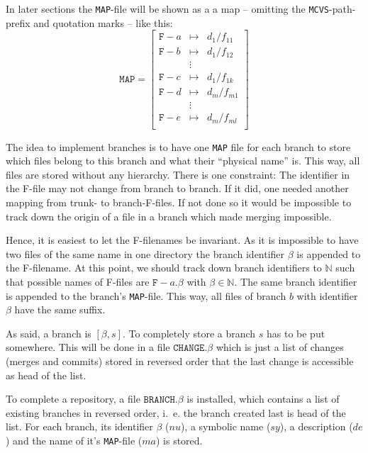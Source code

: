 \documentclass[fleqn, 10pt, a4paper]{report}
\begin{document}
In later sections the \texttt{MAP}-file will be shown as a
a map -- omitting the \texttt{MCVS}-path-prefix and quotation
marks -- like this:
\begin{displaymath}
\mathtt{MAP} =\left[
\begin{array}{lcl}
\mathtt{F-}a &\mapsto& d_1/f_{11} \\
\mathtt{F-}b &\mapsto& d_1/f_{12} \\
             &\vdots & \\
\mathtt{F-}c &\mapsto& d_1/f_{1k} \\
\mathtt{F-}d &\mapsto& d_m/f_{m1} \\
             &\vdots & \\
\mathtt{F-}e &\mapsto& d_m/f_{ml} \\
\end{array}\right]
\end{displaymath}

The idea to implement branches is to have one \texttt{MAP} file
for each branch to store which files belong to this branch and what
their ``physical name'' is. This way, all files are stored without
any hierarchy. There is one constraint: The identifier in the
F-file may not change from branch to branch. If it did, one
needed another mapping from trunk- to branch-F-files. If not done
so it would be impossible to track down the origin of a file in
a branch which made merging impossible.

Hence, it is easiest to let the F-filenames be invariant. As it is
impossible to have two files of the same name in one directory the
branch identifier $\beta$ is appended to the F-filename. At this
point, we should track down branch identifiers to $\mathbb{N}$
such that possible names of F-files are $\mathtt{F-}a\mathtt{.}\beta$
with $\beta\in \mathbb{N}$. The same branch identifier is appended
to the branch's \texttt{MAP}-file. This way, all files of
branch $b$ with identifier $\beta$ have the same suffix.

As said, a branch is $[\beta, s]$. To completely store a branch
$s$ has to be put somewhere. This will be done in a file
$\mathtt{CHANGE}.\beta$ which is just a list of changes (merges
and commits) stored in reversed order that the last change is
accessible as head of the list.

To complete a repository, a file $\mathtt{BRANCH.}\beta$ is installed,
which contains a list of existing branches in reversed order,
i.~e. the branch created last is head of the list.
For each branch, its identifier $\beta$ ($nu$), a symbolic name
($sy$), a description ($de$) and the name of it's
\texttt{MAP}-file ($ma$) is stored.
\end{document}
